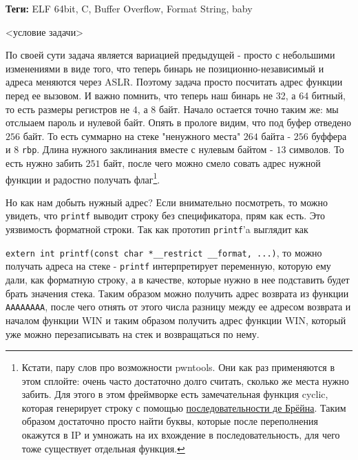 \documentclass[idxtotoc,hyperref,openany,oneside]{files/pwn} %
\begin{document}



\textbf{Теги:} ELF 64bit, C, Buffer Overflow, Format String, baby\vspace{\baselineskip}

\begin{tcolorbox}
<условие задачи>
\end{tcolorbox}

По своей сути задача является вариацией предыдущей - просто с небольшими изменениями в виде того, что теперь бинарь не позиционно-независимый и адреса меняются через ASLR. Поэтому задача просто посчитать адрес функции перед ее вызовом. И важно помнить, что теперь наш бинарь не 32, а 64 битный, то есть размеры регистров не $4$, а $8$ байт.
Начало остается точно таким же: мы отслыаем пароль и нулевой байт. Опять в прологе видим, что под буфер отведено $256$ байт. То есть суммарно на стеке "ненужного места" $264$ байта - $256$ буффера и $8$ \verb|rbp|. Длина нужного заклинания вместе с нулевым байтом - $13$ символов. То есть нужно забить $251$ байт, после чего можно смело совать адрес нужной функции и радостно получать флаг\footnote{Кстати, пару слов про возможности pwntools. Они как раз применяются в этом сплойте: очень часто достаточно долго считать, сколько же места нужно забить. Для этого в этом фреймворке есть замечательная функция cyclic, которая генерирует строку с помощью \href{https://en.wikipedia.org/wiki/De_Bruijn_sequence}{последовательности де Брёйна}. Таким образом достаточно просто найти буквы, которые после переполнения окажутся в IP и умножать на их вхождение в последовательность, для чего тоже существует отдельная функция.}.

Но как нам добыть нужный адрес? Если внимательно посмотреть, то можно увидеть, что \verb|printf| выводит строку без спецификатора, прям как есть. Это уязвимость форматной строки. Так как прототип \verb|printf|'a выглядит как 

\verb|extern int printf(const char *__restrict __format, ...)|, то можно получать адреса на стеке - \verb|printf| интерпретирует переменную, которую ему дали, как форматную строку, а в качестве, которые нужно в нее подставить будет брать значения стека. Таким образом можно получить адрес возврата из функции \verb|AAAAAAAA|, после чего отнять от этого числа разницу между ее адресом возврата и началом функции WIN и таким образом получить адрес функции WIN, который уже можно перезаписывать на стек и возвращаться по нему.
\end{document}
